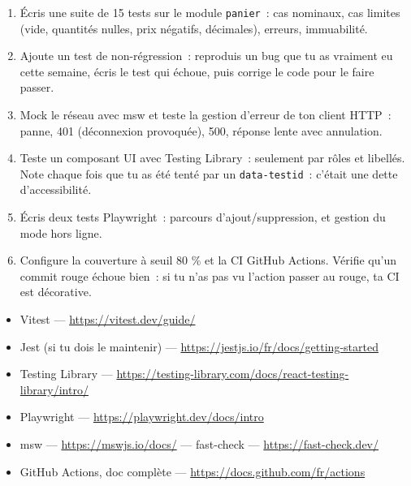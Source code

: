 \documentclass[12pt,a4paper,twoside,openright]{book}
\begin{document}
\begin{exercice}
\begin{enumerate}
  \item \'Ecris une suite de 15 tests sur le module \verb|panier|~: cas nominaux, cas limites
        (vide, quantit\'es nulles, prix n\'egatifs, d\'ecimales), erreurs, immuabilit\'e.
  \item Ajoute un test de non-r\'egression~: reproduis un bug que tu as vraiment eu cette semaine,
        \'ecris le test qui \'echoue, puis corrige le code pour le faire passer.
  \item Mock le r\'eseau avec msw et teste la gestion d'erreur de ton client HTTP~: panne,
        401 (d\'econnexion provoqu\'ee), 500, r\'eponse lente avec annulation.
  \item Teste un composant UI avec Testing Library~: seulement par r\^oles et libell\'es. Note
        chaque fois que tu as \'et\'e tent\'e par un \verb|data-testid|~: c'\'etait une dette d'accessibilit\'e.
  \item \'Ecris deux tests Playwright~: parcours d'ajout/suppression, et gestion du mode hors ligne.
  \item Configure la couverture \`a seuil 80 \% et la CI GitHub Actions. V\'erifie qu'un commit
        rouge \'echoue bien~: si tu n'as pas vu l'action passer au rouge, ta CI est d\'ecorative.
\end{enumerate}
\end{exercice}

\begin{ressources}
\begin{itemize}
  \item Vitest --- \url{https://vitest.dev/guide/}
  \item Jest (si tu dois le maintenir) --- \url{https://jestjs.io/fr/docs/getting-started}
  \item Testing Library --- \url{https://testing-library.com/docs/react-testing-library/intro/}
  \item Playwright --- \url{https://playwright.dev/docs/intro}
  \item msw --- \url{https://mswjs.io/docs/} --- fast-check --- \url{https://fast-check.dev/}
  \item GitHub Actions, doc compl\`ete --- \url{https://docs.github.com/fr/actions}
\end{itemize}
\end{ressources}

\end{document}
